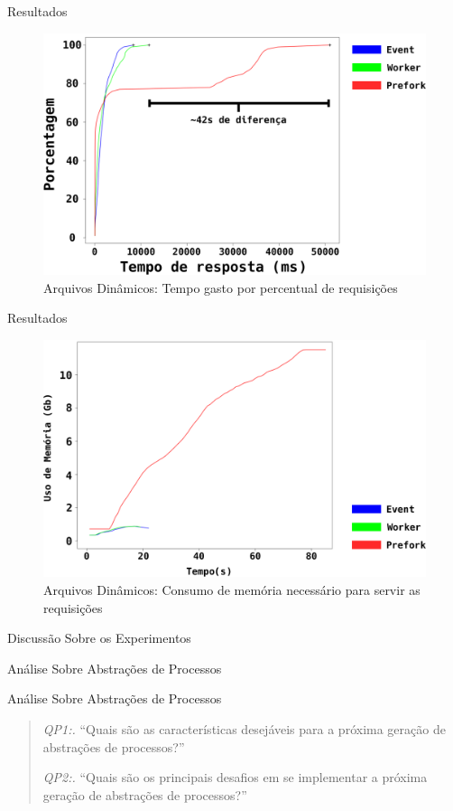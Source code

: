 \documentclass[xcolor={usenames,svgnames,dvipsnames},brazil,english,12pt,aspectratio=149]{beamer}
\begin{document}
\begin{frame}{Resultados}
	\begin{figure}[!h]
		\centering
		\includegraphics[width=.60\textwidth]{dynamic_file_request_time}

		\caption{Arquivos Dinâmicos: Tempo gasto por percentual de requisições}
		\label{fig:dynamic_file}
	\end{figure}
\end{frame}

\begin{frame}{Resultados}
	\begin{figure}[!h]
		\centering
		\includegraphics[width=.60\textwidth]{dynamic_file_memory_usage}

		\caption{Arquivos Dinâmicos: Consumo de memória necessário para servir as requisições}
		\label{fig:dynamic_file_memory}
	\end{figure}
\end{frame}

\begin{frame}{Discussão Sobre os Experimentos}
\end{frame}

\begin{frame}{Análise Sobre Abstrações de Processos}
\end{frame}

\begin{frame}{Análise Sobre Abstrações de Processos}
	\begin{quote}
	 \item \textit{QP1:.} ``Quais são as características desejáveis para a próxima geração de abstrações de processos?''
	 \item \textit{QP2:.} ``Quais são os principais desafios em se implementar a próxima geração de abstrações de processos?''
	\end{quote}
\end{frame}
\end{document}
